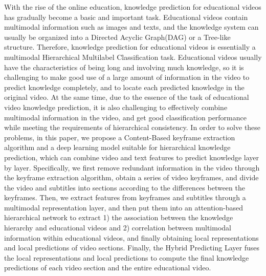 \begin{abstract*}
    With the rise of the online education, knowledge prediction for educational videos has gradually become a basic and important task.
    Educational videos contain multimodal information such as images and texts, and the knowledge system can usually be organized into a Directed Acyclic Graph(DAG) or a Tree-like structure.
    Therefore, knowledge prediction for educational videos is essentially a multimodal Hierarchical Multilabel Classification task.
    Educational videos usually have the characteristics of being long and involving much knowledge,
    so it is challenging to make good use of a large amount of information in the video to predict knowledge completely, and to locate each predicted knowledge in the original video.
    At the same time, due to the essence of the task of educational video knowledge prediction,
    it is also challenging to effectively combine multimodal information in the video, and get good classification performance while meeting the requirements of hierarchical consistency.
    In order to solve these problems, in this paper, we propose a Content-Based keyframe extraction algorithm and a deep learning model suitable for hierarchical knowledge prediction,
    which can combine video and text features to predict knowledge layer by layer.
    Specifically, we first remove redundant information in the video through the keyframe extraction algorithm,
    obtain a series of video keyframes, and divide the video and subtitles into sections according to the differences between the keyframes.
    Then, we extract features from keyframes and subtitles through a multimodal representation layer, and then put them into an attention-based hierarchical network to extract
    1) the association between the knowledge hierarchy and educational videos and
    2) correlation between multimodal information within educational videos,
    and finally obtaining local representations and local predictions of video sections.
    Finally, the Hybrid Predicting Layer fuses the local representations and local predictions to compute the final knowledge predictions of each video section and the entire educational video.
\end{abstract*}
